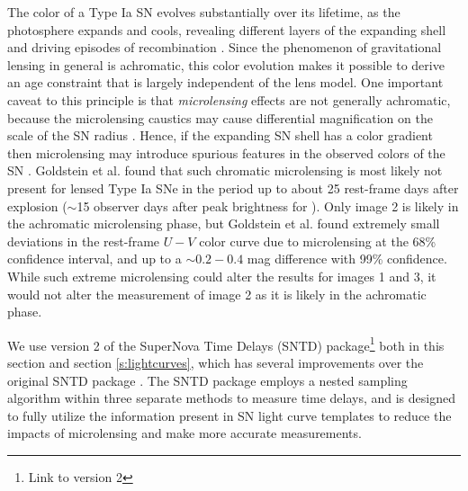 \documentclass[twocolumn]{aastex63}
\begin{document}
The color of a Type Ia SN evolves substantially over its lifetime, as the photosphere expands and cools, revealing different layers of the expanding shell and driving episodes of recombination \citep{woosley_type_2007,kasen_type_2009}. Since the phenomenon of gravitational lensing in general is achromatic, this color evolution makes it possible to derive an age constraint that is largely independent of the lens model.  One important caveat to this principle is that {\it microlensing} effects are not generally achromatic, because the microlensing caustics may cause differential magnification on the scale of the SN radius \citep{goldstein_precise_2018,foxley-marrable_impact_2018,bonvin_impact_2019}.  Hence, if the expanding SN shell has a color gradient then microlensing may introduce spurious features in the observed colors of the SN .   Goldstein et al. \cite{goldstein_precise_2018} found that such chromatic microlensing is most likely not present for lensed Type Ia SNe in the period up to about 25 rest-frame days after explosion ($\sim$15 observer days after peak brightness for \SNABC). Only image 2 is likely in the achromatic microlensing phase, but Goldstein et al. \cite{goldstein_precise_2018} found extremely small deviations in the rest-frame $U-V$ color curve due to microlensing at the 68\% confidence interval, and up to a $\sim0.2-0.4$ mag difference with 99\% confidence. While such extreme microlensing could alter the results for images 1 and 3, it would not alter the measurement of image 2 as it is likely in the achromatic phase.

We use version 2 of the SuperNova Time Delays (SNTD) package\footnote{Link to version 2} both in this section and section \ref{s:lightcurves}, which has several improvements over the original SNTD package \citep{pierel_turning_2019}. The SNTD package employs a nested sampling algorithm within three separate methods to measure time delays, and is designed to fully utilize the information present in SN light curve templates \citep[e.g.][]{hsiao_k_2007,kessler_results_2010,pierel_extending_2018} to reduce the impacts of microlensing and make more accurate measurements. 
\end{document}
